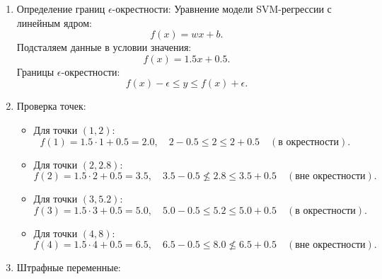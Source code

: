 \begin{enumerate}
    \item Определение границ \(\epsilon\)-окрестности:
          Уравнение модели SVM-регрессии с линейным ядром:
          \begin{equation*}
              f(x) = wx + b.
          \end{equation*}
          Подсталяем данные в условии значения:
          \begin{equation*}
              f(x) = 1.5x + 0.5.
          \end{equation*}
          Границы \(\epsilon\)-окрестности:
          \begin{equation*}
              f(x) - \epsilon \leq y \leq f(x) + \epsilon.
          \end{equation*}
    \item Проверка точек:
          \begin{itemize}
              \item Для точки \((1, 2)\):
                    \begin{equation*}
                        f(1) = 1.5 \cdot 1 + 0.5 = 2.0, \quad 2 - 0.5 \leq 2 \leq 2 + 0.5 \quad (\text{в окрестности}).
                    \end{equation*}
              \item Для точки \((2, 2.8)\):
                    \begin{equation*}
                        f(2) = 1.5 \cdot 2 + 0.5 = 3.5, \quad 3.5 - 0.5 \not\leq 2.8 \leq 3.5 + 0.5 \quad (\text{вне окрестности}).
                    \end{equation*}
              \item Для точки \((3, 5.2)\):
                    \begin{equation*}
                        f(3) = 1.5 \cdot 3 + 0.5 = 5.0, \quad 5.0 - 0.5 \leq 5.2 \leq 5.0 + 0.5 \quad (\text{в окрестности}).
                    \end{equation*}
              \item Для точки \((4, 8)\):
                    \begin{equation*}
                        f(4) = 1.5 \cdot 4 + 0.5 = 6.5, \quad 6.5 - 0.5 \leq 8.0 \not\leq 6.5 + 0.5 \quad (\text{вне окрестности}).
                    \end{equation*}
          \end{itemize}
    \item Штрафные переменные:
          \begin{itemize}

\end{itemize}
\end{enumerate}
